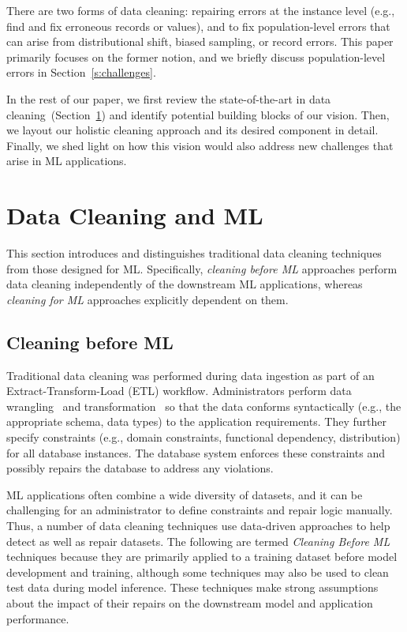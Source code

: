\documentclass[11pt,dvipsnames]{article}
\begin{document}
 There are two forms of data cleaning: repairing errors at the instance level (e.g., find and fix erroneous records or values), and to fix population-level errors that can arise from distributional shift, biased sampling, or record errors.  This paper primarily focuses on the former notion, and we briefly discuss population-level errors in Section~\ref{s:challenges}.



\noindent In the rest of our paper, we first review the state-of-the-art in data cleaning~(Section~\ref{sec:current}) and identify potential building blocks of our vision. Then, we layout our holistic cleaning approach and its desired component in detail. Finally, we shed light on how this vision would also address new challenges that arise in ML applications. 


\section{Data Cleaning and ML}\label{sec:current}

This section introduces and distinguishes traditional data cleaning techniques from those designed for ML.
Specifically, {\it cleaning before ML} approaches perform data cleaning independently of the downstream ML applications,
whereas {\it cleaning for ML} approaches explicitly dependent on them.


\subsection{Cleaning before ML}

Traditional data cleaning was performed during data ingestion as part of an Extract-Transform-Load (ETL) workflow.  Administrators perform data wrangling~\cite{datawrangler,potter} and transformation~\cite{DataXFormer} so that the data conforms syntactically (e.g., the appropriate schema, data types) to the application requirements.  They further specify constraints (e.g., domain constraints, functional dependency, distribution) for all database instances. The database system enforces these constraints and possibly repairs the database to address any violations.  

ML applications often combine a wide diversity of datasets, and it can be challenging for an administrator to define constraints and repair logic manually.  Thus, a number of data cleaning techniques use data-driven approaches to help detect as well as repair datasets.   The following are termed {\it Cleaning Before ML} techniques because they are primarily applied to a training dataset before model development and training, although some techniques may also be used to clean test data during model inference.   These techniques make strong assumptions about the impact of their repairs on the downstream model and application performance.  
\end{document}
